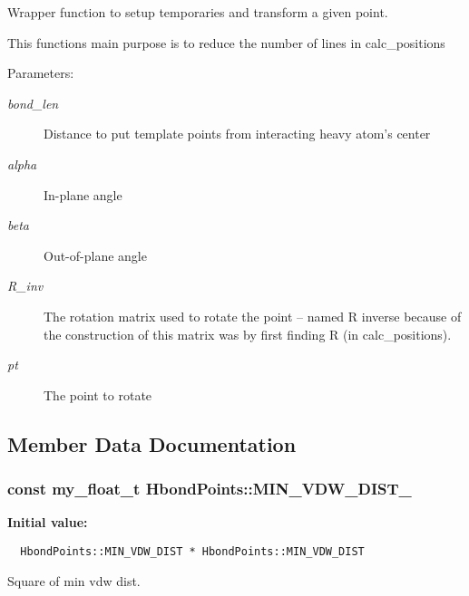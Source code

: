 Wrapper function to setup temporaries and transform a given point. 

This functions main purpose is to reduce the number of lines in calc\_\-positions

\begin{Desc}
\item[Parameters:]
\begin{description}
\item[{\em bond\_\-len}]Distance to put template points from interacting heavy atom's center \item[{\em alpha}]In-plane angle \item[{\em beta}]Out-of-plane angle \item[{\em R\_\-inv}]The rotation matrix used to rotate the point -- named R inverse because of the construction of this matrix was by first finding R (in calc\_\-positions). \item[{\em pt}]The point to rotate \end{description}
\end{Desc}


\subsection{Member Data Documentation}
\subsubsection{\setlength{\rightskip}{0pt plus 5cm}const my\_\-float\_\-t \bf{Hbond\-Points::MIN\_\-VDW\_\-DIST\_}\hspace{0.3cm}{\tt  [static, private]}}\label{classASCbase_1_1HbondPoints_c3782b5110cb3ebf7c9c81fe98bac1a8}


\textbf{Initial value:}

\begin{Code}\begin{verbatim} 
  HbondPoints::MIN_VDW_DIST * HbondPoints::MIN_VDW_DIST
\end{verbatim}\end{Code}
Square of min vdw dist. 

